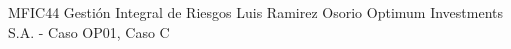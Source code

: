 \documentclass[11pt]{article}
\newcommand{\CaseId}{C} %
\begin{document}
\cover
  {MFIC44 Gestión Integral de Riesgos}
  {Luis Ramirez Osorio}
  {Optimum Investments S.A. - Caso OP01, Caso \CaseId}

\tableofcontents
\newpage









\printbibliography

\clearpage
\appendix




\end{document}
